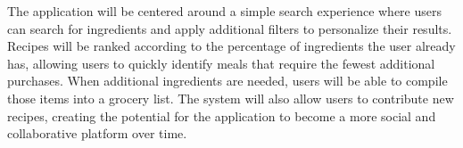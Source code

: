 The application will be centered around a simple search experience where users can search for ingredients and apply additional filters to personalize their results. Recipes will be ranked according to the percentage of ingredients the user already has, allowing users to quickly identify meals that require the fewest additional purchases. When additional ingredients are needed, users will be able to compile those items into a grocery list. The system will also allow users to contribute new recipes, creating the potential for the application to become a more social and collaborative platform over time.
